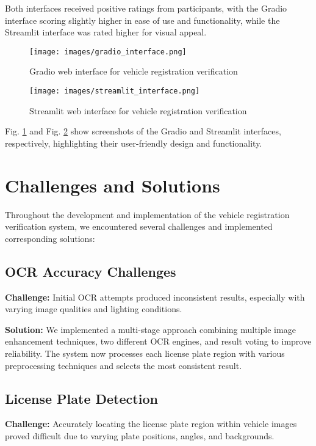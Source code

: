 \documentclass[conference]{IEEEtran}
\begin{document}
Both interfaces received positive ratings from participants, with the Gradio interface scoring slightly higher in ease of use and functionality, while the Streamlit interface was rated higher for visual appeal.

\begin{figure}[h]
\centering
\texttt{[image: images/gradio\_interface.png]}
\caption{Gradio web interface for vehicle registration verification}
\label{fig:gradio_interface}
\end{figure}

\begin{figure}[h]
\centering
\texttt{[image: images/streamlit\_interface.png]}
\caption{Streamlit web interface for vehicle registration verification}
\label{fig:streamlit_interface}
\end{figure}

Fig. \ref{fig:gradio_interface} and Fig. \ref{fig:streamlit_interface} show screenshots of the Gradio and Streamlit interfaces, respectively, highlighting their user-friendly design and functionality.

\section{Challenges and Solutions}

Throughout the development and implementation of the vehicle registration verification system, we encountered several challenges and implemented corresponding solutions:

\subsection{OCR Accuracy Challenges}
\textbf{Challenge:} Initial OCR attempts produced inconsistent results, especially with varying image qualities and lighting conditions.

\textbf{Solution:} We implemented a multi-stage approach combining multiple image enhancement techniques, two different OCR engines, and result voting to improve reliability. The system now processes each license plate region with various preprocessing techniques and selects the most consistent result.

\subsection{License Plate Detection}
\textbf{Challenge:} Accurately locating the license plate region within vehicle images proved difficult due to varying plate positions, angles, and backgrounds.
\end{document}
